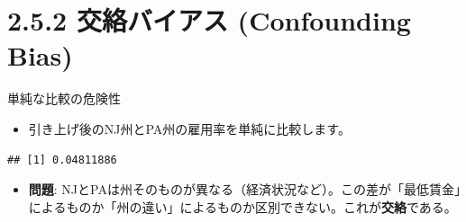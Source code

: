\documentclass[
  ignorenonframetext,
]{beamer}
\newenvironment{Shaded}{\begin{snugshade}}{\end{snugshade}}
\newcommand{\CommentTok}[1]{\textcolor[rgb]{0.56,0.35,0.01}{\textit{#1}}}
\newcommand{\FunctionTok}[1]{\textcolor[rgb]{0.00,0.00,0.00}{#1}}
\newcommand{\NormalTok}[1]{#1}
\newcommand{\OtherTok}[1]{\textcolor[rgb]{0.56,0.35,0.01}{#1}}
\newcommand{\SpecialCharTok}[1]{\textcolor[rgb]{0.00,0.00,0.00}{#1}}
\providecommand{\tightlist}{%
  \setlength{\itemsep}{0pt}\setlength{\parskip}{0pt}}
\begin{document}
\hypertarget{ux4ea4ux7d61ux30d0ux30a4ux30a2ux30b9-confounding-bias}{%
\section{2.5.2 交絡バイアス (Confounding
Bias)}\label{ux4ea4ux7d61ux30d0ux30a4ux30a2ux30b9-confounding-bias}}

\begin{frame}[fragile]{単純な比較の危険性}
\protect\hypertarget{ux5358ux7d14ux306aux6bd4ux8f03ux306eux5371ux967aux6027}{}
\begin{itemize}
\tightlist
\item
  引き上げ後のNJ州とPA州の雇用率を単純に比較します。
\end{itemize}

\scriptsize

\begin{Shaded}
\end{Shaded}

\begin{verbatim}
## [1] 0.04811886
\end{verbatim}

\normalsize

\begin{itemize}
\tightlist
\item
  \textbf{問題}:
  NJとPAは州そのものが異なる（経済状況など）。この差が「最低賃金」によるものか「州の違い」によるものか区別できない。これが\textbf{交絡}である。
\end{itemize}
\end{frame}
\end{document}

